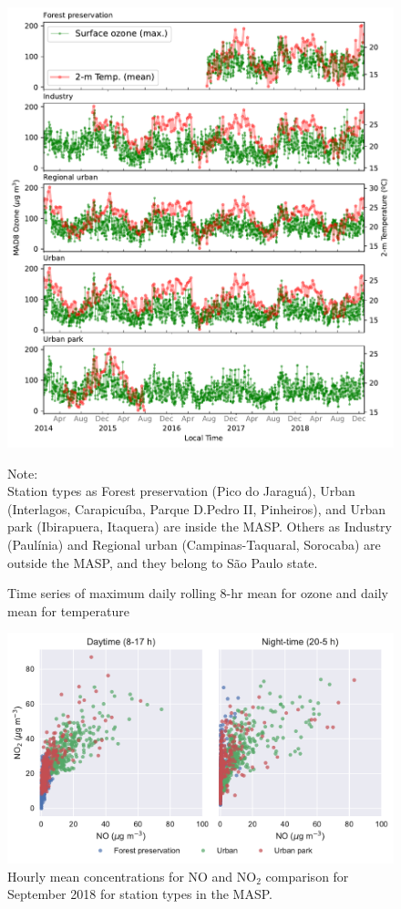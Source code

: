 	\begin{figure}[htbp]
 		\includegraphics[width=1\textwidth]{fig/ozone_2014_2018_series.pdf}
  		\caption{Time series of maximum daily rolling 8-hr mean for ozone and daily mean for temperature}
   		{\scriptsize Note: \\ Station types as Forest preservation (Pico do Jaraguá), Urban (Interlagos, Carapicuíba, Parque D.Pedro II, Pinheiros), and Urban park (Ibirapuera, Itaquera) are inside the MASP.
  		Others as Industry (Paulínia) and Regional urban (Campinas-Taquaral, Sorocaba) are outside the MASP, and they belong to São Paulo state.}
  		\label{fig:o3_years}
	\end{figure}

	\begin{figure}[!htb]
  		\includegraphics[width=1\textwidth]{fig/NoNo2_ratio.pdf}
  		\caption{Hourly mean concentrations for NO and NO$_2$ comparison for September 2018 for station types in the MASP.}
  		\label{fig:NoNo2_ratio}
	\end{figure}
	
